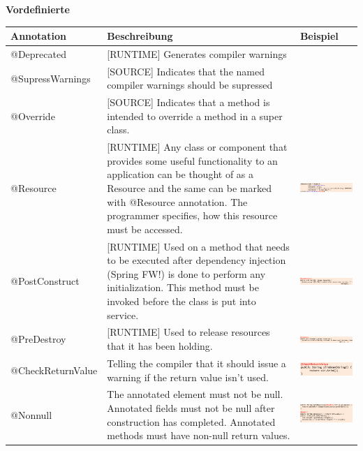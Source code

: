 \documentclass[10pt]{article}
\begin{document}
\textbf{Vordefinierte}\\
\begin{tabular}{| l | p{8cm} | m{6cm} |}
\hline
Annotation & Beschreibung & Beispiel \\ \hline
@Deprecated & [RUNTIME] Generates compiler warnings & \\ \hline
@SupressWarnings & [SOURCE] Indicates that the named compiler warnings should be supressed & \\ \hline
@Override & [SOURCE] Indicates that a method is intended to override a method in a super class. & \\ \hline
@Resource & [RUNTIME] Any class or component that provides some useful functionality to an application can be thought of as a Resource and the same can be marked with @Resource annotation. The programmer specifies, how this resource must be accessed. & \includegraphics[width=6cm]{annotation_resource.PNG} \\ \hline
@PostConstruct & [RUNTIME] Used on a method that needs to be executed after dependency injection (Spring FW!) is done to perform any initialization. This method must be invoked before the class is put into service. & \includegraphics[width=6cm]{annotation_post.PNG} \\ \hline
@PreDestroy & [RUNTIME] Used to release resources that it has been holding. & \includegraphics[width=6cm]{annotation_pre.PNG} \\ \hline
@CheckReturnValue & Telling the compiler that it should issue a warning if the return value isn't used. & \includegraphics[width=6cm]{annotation_checkretval.PNG} \\ \hline
@Nonnull &  The annotated element must not be null. Annotated fields must not be null after construction has completed. Annotated methods must have non-null return values. & \includegraphics[width=6cm]{annotation_nonnull.PNG} \\ \hline

\end{tabular}
\end{document}
